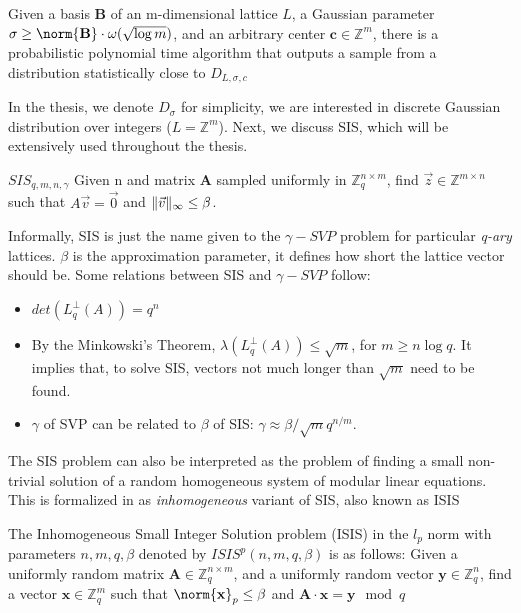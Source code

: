 \begin{lemma}
   Given a basis \textbf{B} of an m-dimensional lattice $L$, a Gaussian parameter $\sigma \geq \norm{\mathbf{B}} \cdot \omega(\sqrt{\log m})$, and an arbitrary center $\mathbf{c} \in \mathbb{Z} ^{m}$, there is a probabilistic polynomial time algorithm that outputs a sample from a distribution statistically close to $D_{L,\sigma,c}$
\end{lemma}

In the thesis, we denote $D_{\sigma}$ for simplicity, we are interested in discrete Gaussian distribution over integers ($L = \mathbb{Z}^{m}$). Next, we discuss SIS, which will be extensively used throughout the thesis.

\begin{definition}
  $SIS_{q,m,n,\gamma}$ Given n and matrix $\mathbf{A}$ sampled uniformly in
  $\mathbb{Z}_q^{n \times m}$, find $\vec{z} \in \mathbb{Z}^{m \times n}$ such
  that $A\vec{v} = \vec{0}$ and $\Vert \vec{v} \Vert_{\infty} \leq \beta$.
  \label{def:SISProblem}
\end{definition}
Informally, SIS is just the name given to the $\gamma-SVP$ problem for
particular \emph{q-ary} lattices. $\beta$ is the approximation parameter, it
defines how short the lattice vector should be. Some relations between SIS and
$\gamma-SVP$ follow:
\begin{itemize}
\item $det(L_q^\bot(A)) = q^n$
\item By the Minkowski's Theorem, $\lambda(L_q^\bot(A)) \leq \sqrt{m}$, for
  $m \geq n \log q$. It implies that, to solve SIS, vectors not much longer
  than $\sqrt{m}$ need to be found.
\item  $\gamma$ of SVP can be related to $\beta$ of SIS:
  $\gamma \approx \beta/\sqrt{m}q^{n/m}$.
\end{itemize}

The SIS problem can also be interpreted as the problem of finding a small
non-trivial solution of a random homogeneous system of modular linear
equations. This is formalized in \cite{gentry2008trapdoors} as
\textit{inhomogeneous} variant of SIS, also known as ISIS

\begin{definition}
  The Inhomogeneous Small Integer Solution problem (ISIS) in the $l_{p}$ norm with parameters $n, m, q, \beta$ denoted by $ISIS^{p}(n, m, q, \beta)$ is as follows: Given a uniformly random matrix $\mathbf{A} \in \mathbb{Z}^{n \times m}_{q}$, and a uniformly random vector $\mathbf{y} \in \mathbb{Z}_{q}^{n}$, find a vector $\mathbf{x} \in \mathbb{Z}_{q}^{m}$ such that $\norm{\mathbf{x}}_{p} \leq \beta$ and $\mathbf{A} \cdot \mathbf{x} = \mathbf{y} \mod q$
\end{definition}

